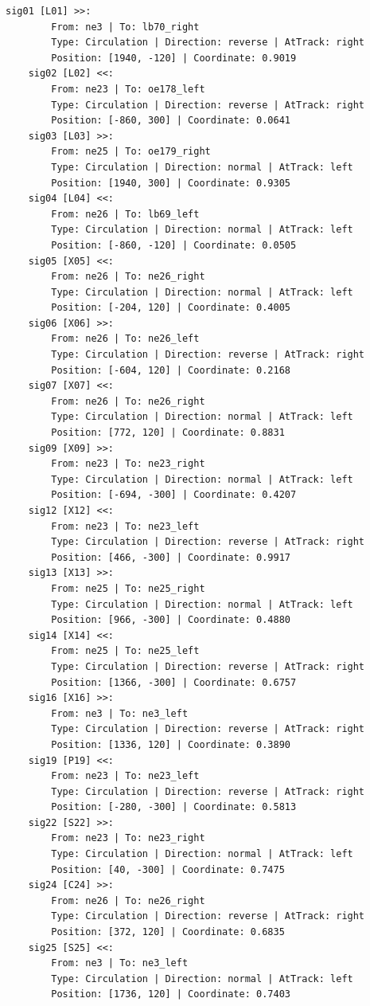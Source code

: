 	\begin{lstlisting}[language = {}, caption = Signalling.RNA, label = {lst:EJ8_6}]
	sig01 [L01] >>:
		From: ne3 | To: lb70_right
		Type: Circulation | Direction: reverse | AtTrack: right 
		Position: [1940, -120] | Coordinate: 0.9019
	sig02 [L02] <<:
		From: ne23 | To: oe178_left
		Type: Circulation | Direction: reverse | AtTrack: right 
		Position: [-860, 300] | Coordinate: 0.0641
	sig03 [L03] >>:
		From: ne25 | To: oe179_right
		Type: Circulation | Direction: normal | AtTrack: left 
		Position: [1940, 300] | Coordinate: 0.9305
	sig04 [L04] <<:
		From: ne26 | To: lb69_left
		Type: Circulation | Direction: normal | AtTrack: left 
		Position: [-860, -120] | Coordinate: 0.0505
	sig05 [X05] <<:
		From: ne26 | To: ne26_right
		Type: Circulation | Direction: normal | AtTrack: left 
		Position: [-204, 120] | Coordinate: 0.4005
	sig06 [X06] >>:
		From: ne26 | To: ne26_left
		Type: Circulation | Direction: reverse | AtTrack: right 
		Position: [-604, 120] | Coordinate: 0.2168
	sig07 [X07] <<:
		From: ne26 | To: ne26_right
		Type: Circulation | Direction: normal | AtTrack: left 
		Position: [772, 120] | Coordinate: 0.8831
	sig09 [X09] >>:
		From: ne23 | To: ne23_right
		Type: Circulation | Direction: normal | AtTrack: left 
		Position: [-694, -300] | Coordinate: 0.4207
	sig12 [X12] <<:
		From: ne23 | To: ne23_left
		Type: Circulation | Direction: reverse | AtTrack: right 
		Position: [466, -300] | Coordinate: 0.9917
	sig13 [X13] >>:
		From: ne25 | To: ne25_right
		Type: Circulation | Direction: normal | AtTrack: left 
		Position: [966, -300] | Coordinate: 0.4880
	sig14 [X14] <<:
		From: ne25 | To: ne25_left
		Type: Circulation | Direction: reverse | AtTrack: right 
		Position: [1366, -300] | Coordinate: 0.6757
	sig16 [X16] >>:
		From: ne3 | To: ne3_left
		Type: Circulation | Direction: reverse | AtTrack: right 
		Position: [1336, 120] | Coordinate: 0.3890
	sig19 [P19] <<:
		From: ne23 | To: ne23_left
		Type: Circulation | Direction: reverse | AtTrack: right 
		Position: [-280, -300] | Coordinate: 0.5813
	sig22 [S22] >>:
		From: ne23 | To: ne23_right
		Type: Circulation | Direction: normal | AtTrack: left 
		Position: [40, -300] | Coordinate: 0.7475
	sig24 [C24] >>:
		From: ne26 | To: ne26_right
		Type: Circulation | Direction: reverse | AtTrack: right 
		Position: [372, 120] | Coordinate: 0.6835
	sig25 [S25] <<:
		From: ne3 | To: ne3_left
		Type: Circulation | Direction: normal | AtTrack: left 
		Position: [1736, 120] | Coordinate: 0.7403
	\end{lstlisting}
	
